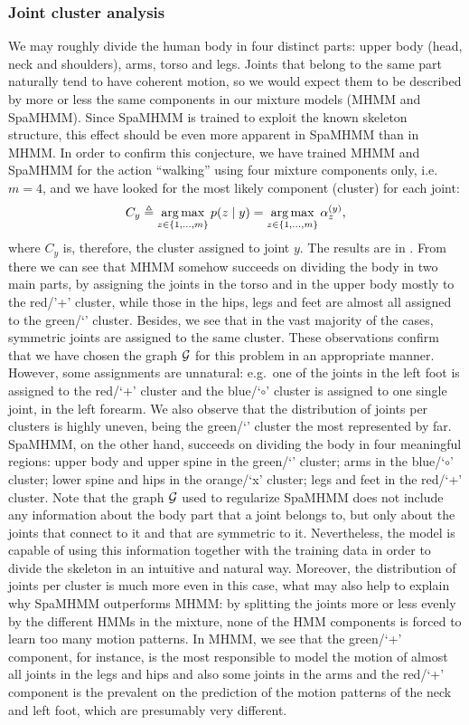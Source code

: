 \subsubsection{Joint cluster analysis}
\label{sec:spamhmm_cluster}
We may roughly divide the human body in four distinct parts: upper body (head, neck and shoulders), arms, torso and legs. Joints that belong to the same part naturally tend to have coherent motion, so we would expect them to be described by more or less the same components in our mixture models (MHMM and SpaMHMM). Since SpaMHMM is trained to exploit the known skeleton structure, this effect should be even more apparent in SpaMHMM than in MHMM. In order to confirm this conjecture, we have trained MHMM and SpaMHMM for the action ``walking'' using four mixture components only, i.e.\ $m=4$, and we have looked for the most likely component (cluster) for each joint:
\begin{equation}
C_y \triangleq \operatorname*{arg\,max}_{z \in \{1,\dots,m\}} p(z \mid y) = \operatorname*{arg\,max}_{z \in \{1,\dots,m\}} {\alpha}^{(y)}_z,
\end{equation}
where $C_y$ is, therefore, the cluster assigned to joint $y$. The results are in . From there we can see that MHMM somehow succeeds on dividing the body in two main parts, by assigning the joints in the torso and in the upper body mostly to the red/'+' cluster, while those in the hips, legs and feet are almost all assigned to the green/`\SmallTriangleUp' cluster. Besides, we see that in the vast majority of the cases, symmetric joints are assigned to the same cluster. These observations confirm that we have chosen the graph ${\mathcal{G}}$ for this problem in an appropriate manner. However, some assignments are unnatural: e.g.\  one of the joints in the left foot is assigned to the red/`+' cluster and the blue/`$\circ$' cluster is assigned to one single joint, in the left forearm. We also observe that the distribution of joints per clusters is highly uneven, being the green/`\SmallTriangleUp' cluster the most represented by far. SpaMHMM, on the other hand, succeeds on dividing the body in four meaningful regions: upper body and upper spine in the green/`\SmallTriangleUp' cluster; arms in the blue/`$\circ$' cluster; lower spine and hips in the orange/`x' cluster; legs and feet in the red/`+' cluster. Note that the graph ${\mathcal{G}}$ used to regularize SpaMHMM does not include any information about the body part that a joint belongs to, but only about the joints that connect to it and that are symmetric to it. Nevertheless, the model is capable of using this information together with the training data in order to divide the skeleton in an intuitive and natural way. Moreover, the distribution of joints per cluster is much more even in this case, what may also help to explain why SpaMHMM outperforms MHMM: by splitting the joints more or less evenly by the different HMMs in the mixture, none of the HMM components is forced to learn too many motion patterns. In MHMM, we see that the green/`+' component, for instance, is the most responsible to model the motion of almost all joints in the legs and hips and also some joints in the arms and the red/`+' component is the prevalent on the prediction of the motion patterns of the neck and left foot, which are presumably very different.

